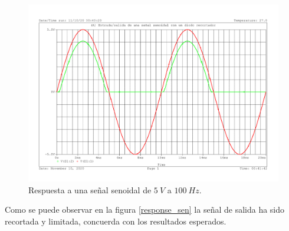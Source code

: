 {  \begin{figure}[H]
    \centering
    \includegraphics[scale=0.5]{images/respuesta_problema_3.pdf}
    \caption{Respuesta a una señal senoidal de $5 \ V$ a $100 \ Hz$.}
    \label{response_sen}
\label{ref_recorte}
\end{figure}

Como se puede observar en la figura \ref{response_sen} la señal de
salida ha sido recortada y limitada, concuerda con los resultados esperados.
}